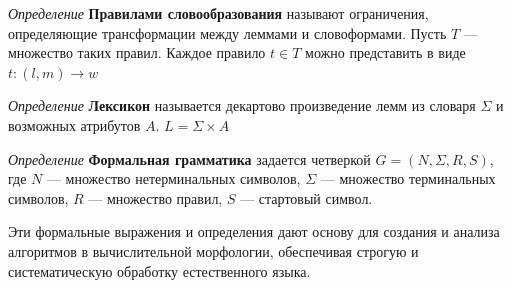 \textit{Определение} \textbf{Правилами словообразования} называют ограничения,
 определяющие трансформации между леммами и словоформами. 
 Пусть \( T \) — множество таких правил. Каждое правило \( t \in T \) можно представить в виде
 $t: (l, m) \rightarrow w$

\textit{Определение} \textbf{Лексикон} называется декартово произведение лемм 
из словаря $\Sigma$ и возможных атрибутов $A$. $L = \Sigma \times A$
 

\textit{Определение} \textbf{Формальная грамматика} задается четверкой
$ G  = \left(N, \Sigma, R, S\right)$, где $N$ — множество нетерминальных символов, 
$\Sigma$ — множество терминальных символов, 
$R$ — множество правил, 
$S$ — стартовый символ.
 
 
 Эти формальные выражения и определения дают основу для создания и анализа алгоритмов в вычислительной морфологии, обеспечивая строгую и систематическую обработку естественного языка.




 
 


